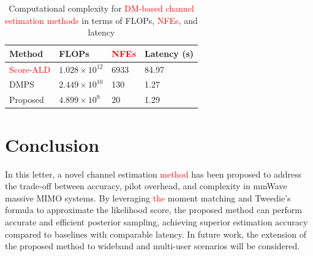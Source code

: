 \documentclass[lettersize,journal]{IEEEtran}
\newcommand{\tred}{\textcolor{red}}
\begin{document}
\begin{table}[!t]
\centering
\renewcommand{\arraystretch}{1.1} 
\caption{Computational complexity for \tred{DM-based channel estimation methods} in terms of FLOPs, \tred{NFEs}, and latency}
\label{tab:table1}
\begin{tabular}{M{0.20\columnwidth}|M{0.21\columnwidth}|M{0.20\columnwidth}|M{0.20\columnwidth}}
\hline
\textbf{Method} & \textbf{FLOPs} & \tred{\textbf{NFEs}} & \textbf{Latency (s)} \\
\hline
\tred{Score-ALD}\cite{arvinteMIMOChannelEstimation2023} & \(1.028 \times 10^{12}\) & 6933 & 84.97 \\
\hline
DMPS\cite{zhouGenerativeDiffusionModels2025} & \(2.449 \times 10^{10}\) & 130 & 1.27 \\
\hline
Proposed & \(4.899 \times 10^9\) & 20 & 1.29 \\
\hline
\end{tabular}
\end{table}

\section{Conclusion}

In this letter, a novel channel estimation \tred{method} has been proposed to address the trade-off between accuracy, pilot overhead, and complexity in mmWave massive MIMO systems. By leveraging \tred{the} moment matching and Tweedie's formula to approximate the likelihood score, the proposed method can perform accurate and efficient posterior sampling, achieving superior estimation accuracy compared to baselines with comparable latency. In future work, the extension of the proposed method to wideband and multi-user scenarios will be considered.


% 

\end{document}
